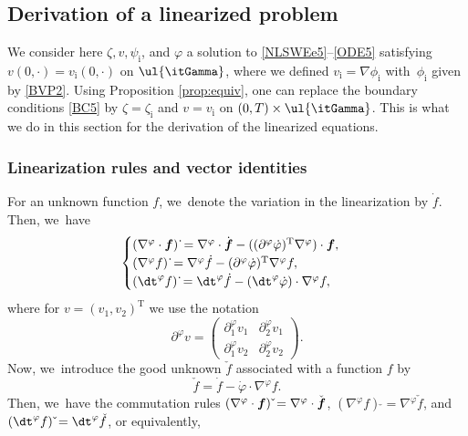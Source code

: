 \subsection{Derivation of a linearized problem}\label{subsect:DLP}
We consider here $\zeta,v,\psi_\mathrm{i}$, and $\varphi$ a solution to \eqref{NLSWEe5}--\eqref{ODE5} satisfying $v(0,\cdot)=v_\mathrm{i}(0,\cdot)$ on $\ul{\itGamma}$,
where we defined $v_\mathrm{i}=\nabla \phi_\mathrm{i}$ with~$\phi_\mathrm{i}$ given by \eqref{BVP2}.
Using Proposition \ref{prop:equiv}, one can replace the boundary conditions \eqref{BC5} by $\zeta=\zeta_\mathrm{i}$ and $v=v_\mathrm{i}$ on $(0,T)\times\ul{\itGamma}$.
This is what we do in this section for the derivation of the linearized equations.

\subsubsection{Linearization rules and vector identities}
For an unknown function $f$, we~denote the variation in the linearization by $\dot{f}$.
Then, we~have
\begin{equation}\label{linearization 1}
\begin{cases}
(\nabla^\varphi \cdot \mbox{\boldmath$f$})\,\dot{}
= \nabla^\varphi \cdot \dot{\mbox{\boldmath$f$}}
- ((\partial^\varphi \dot{\varphi})^\mathrm{T}\nabla^\varphi) \cdot \mbox{\boldmath$f$}, \\
(\nabla^\varphi f)\,\dot{}
= \nabla^\varphi \dot{f} - (\partial^\varphi \dot{\varphi})^\mathrm{T}\nabla^\varphi f, \\
(\dt^\varphi f)\,\dot{}
= \dt^\varphi\dot{f} - (\dt^\varphi\dot{\varphi}) \cdot \nabla^\varphi f,
\end{cases}
\end{equation}
where for $v = (v_1,v_2)^\mathrm{T}$ we use the notation
\[
\partial^\varphi v =
\begin{pmatrix}
\partial_1^\varphi v_1 & \partial_2^\varphi v_1 \\
\partial_1^\varphi v_2 & \partial_2^\varphi v_2
\end{pmatrix}.
\]
Now, we~introduce the good unknown $\check{f}$ associated with a function $f$ by
\begin{equation}\label{GoodUnknown}
\check{f} = \dot{f} - \dot{\varphi} \cdot \nabla^\varphi f.
\end{equation}
Then, we~have the commutation rules $(\nabla^\varphi\cdot \mbox{\boldmath$f$})\,\check{} =\nabla^\varphi\cdot \check{\mbox{\boldmath$f$}}$,
$(\nabla^\varphi f)\,\check{} =\nabla^\varphi \check{f}$, and $(\dt^\varphi f)\,\check{} =\dt^\varphi \check{f}$, or equivalently,
